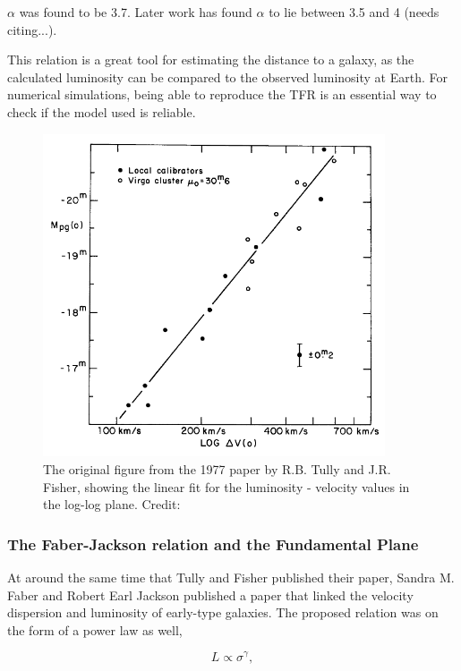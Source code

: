 $\alpha$ was found to be 3.7. Later work has found $\alpha$ to lie between 3.5 and 4 (needs citing...).

This relation is a great tool for estimating the distance to a galaxy, as the calculated luminosity can be compared to the observed luminosity at Earth. For numerical simulations, being able to reproduce the TFR is an essential way to check if the model used is reliable.

\begin{figure}
    \centering
    \includegraphics[width=0.9\textwidth]{images/tully_fisher.png}
    \caption{The original figure from the 1977 paper by R.B. Tully and J.R. Fisher, showing the linear fit for the luminosity - velocity values in the log-log plane. Credit: \cite{TullyFisher1977}}
    \label{tully_fisher}
\end{figure}

\subsubsection{The Faber-Jackson relation and the Fundamental Plane}
At around the same time that Tully and Fisher published their paper, Sandra M. Faber and Robert Earl Jackson published a paper that linked the velocity dispersion and luminosity of early-type galaxies. The proposed relation was on the form of a power law as well,

\begin{equation}
    L \propto \sigma^{\gamma},
\end{equation}

